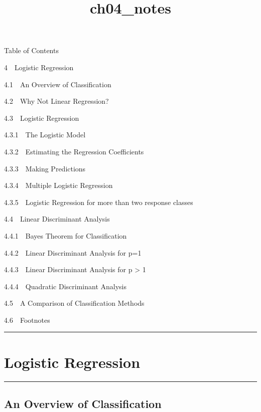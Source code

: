 \documentclass[11pt]{article}
\title{ch04\_notes}
\begin{document}
    
    
    \maketitle
    
    

    
    Table of Contents{}

{{4~~}Logistic Regression}

{{4.1~~}An Overview of Classification}

{{4.2~~}Why Not Linear Regression?}

{{4.3~~}Logistic Regression}

{{4.3.1~~}The Logistic Model}

{{4.3.2~~}Estimating the Regression Coefficients}

{{4.3.3~~}Making Predictions}

{{4.3.4~~}Multiple Logistic Regression}

{{4.3.5~~}Logistic Regression for more than two response classes}

{{4.4~~}Linear Discriminant Analysis}

{{4.4.1~~}Bayes Theorem for Classification}

{{4.4.2~~}Linear Discriminant Analysis for p=1}

{{4.4.3~~}Linear Discriminant Analysis for p \textgreater{} 1}

{{4.4.4~~}Quadratic Discriminant Analysis}

{{4.5~~}A Comparison of Classification Methods}

{{4.6~~}Footnotes}

    \begin{center}\rule{0.5\linewidth}{\linethickness}\end{center}

\hypertarget{logistic-regression}{%
\section{Logistic Regression}\label{logistic-regression}}

\begin{center}\rule{0.5\linewidth}{\linethickness}\end{center}

    \hypertarget{an-overview-of-classification}{%
\subsection{An Overview of
Classification}\label{an-overview-of-classification}}
\end{document}
